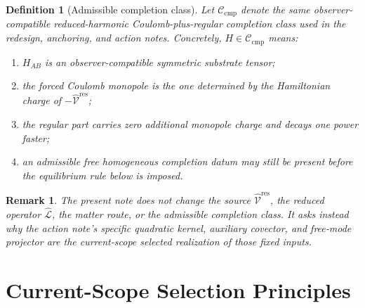 \documentclass[11pt]{article}
\newcommand{\ResidualLift}{\widehat{\mathcal V}^{\mathrm{res}}}
\newcommand{\SubReducedEin}{\widehat{\mathcal L}}
\newcommand{\CompClass}{\mathscr C_{\mathrm{cmp}}}
\newtheorem{definition}{Definition}
\newtheorem{remark}{Remark}
\begin{document}
\begin{definition}[Admissible completion class]
\label{def:class}
Let \(\CompClass\) denote the same observer-compatible reduced-harmonic Coulomb-plus-regular completion class used in the redesign, anchoring, and action notes. Concretely, \(H\in\CompClass\) means:
\begin{enumerate}
    \item \(H_{AB}\) is an observer-compatible symmetric substrate tensor;
    \item the forced Coulomb monopole is the one determined by the Hamiltonian charge of \(-\ResidualLift\);
    \item the regular part carries zero additional monopole charge and decays one power faster;
    \item an admissible free homogeneous completion datum may still be present before the equilibrium rule below is imposed.
\end{enumerate}
\end{definition}

\begin{remark}
The present note does not change the source \(\ResidualLift\), the reduced operator \(\SubReducedEin\), the matter route, or the admissible completion class. It asks instead why the action note's specific quadratic kernel, auxiliary covector, and free-mode projector are the current-scope selected realization of those fixed inputs.
\end{remark}

\section{Current-Scope Selection Principles}
\end{document}
